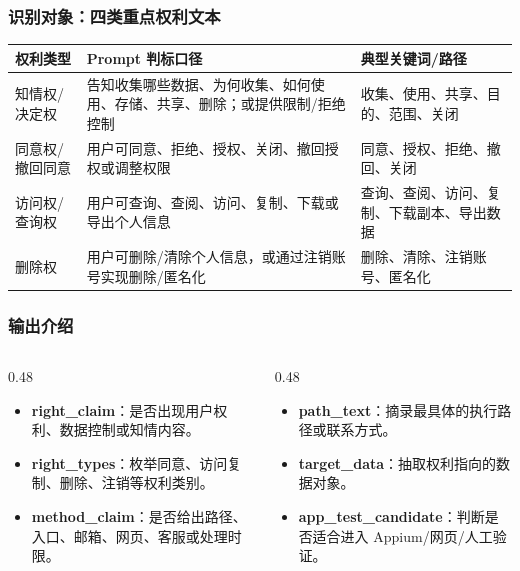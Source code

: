 \documentclass[AutoFakeBold,AutoFakeSlant]{beamer}
\begin{document}
\begin{frame}
    \frametitle{识别对象：四类重点权利文本}
    \small
    \begin{tabularx}{\textwidth}{|p{}|X|p{}|}
        \toprule
        \textbf{权利类型} & \textbf{Prompt 判标口径} & \textbf{典型关键词/路径} \\
        \midrule
        知情权/决定权 & 告知收集哪些数据、为何收集、如何使用、存储、共享、删除；或提供限制/拒绝控制 & 收集、使用、共享、目的、范围、关闭 \\
        \midrule
        同意权/撤回同意 & 用户可同意、拒绝、授权、关闭、撤回授权或调整权限 & 同意、授权、拒绝、撤回、关闭 \\
        \midrule
        访问权/查询权 & 用户可查询、查阅、访问、复制、下载或导出个人信息 & 查询、查阅、访问、复制、下载副本、导出数据 \\
        \midrule
        删除权 & 用户可删除/清除个人信息，或通过注销账号实现删除/匿名化 & 删除、清除、注销账号、匿名化 \\
        \bottomrule
    \end{tabularx}
\end{frame}

\begin{frame}
    \frametitle{输出介绍}
    \small
    \begin{columns}
        \begin{column}{0.48\textwidth}
            \begin{itemize}
                \item \textbf{right\_claim}：是否出现用户权利、数据控制或知情内容。
                \item \textbf{right\_types}：枚举同意、访问复制、删除、注销等权利类别。
                \item \textbf{method\_claim}：是否给出路径、入口、邮箱、网页、客服或处理时限。
            \end{itemize}
        \end{column}
        \begin{column}{0.48\textwidth}
            \begin{itemize}
                \item \textbf{path\_text}：摘录最具体的执行路径或联系方式。
                \item \textbf{target\_data}：抽取权利指向的数据对象。
                \item \textbf{app\_test\_candidate}：判断是否适合进入 Appium/网页/人工验证。
            \end{itemize}
        \end{column}
    \end{columns}
\end{frame}
\end{document}

